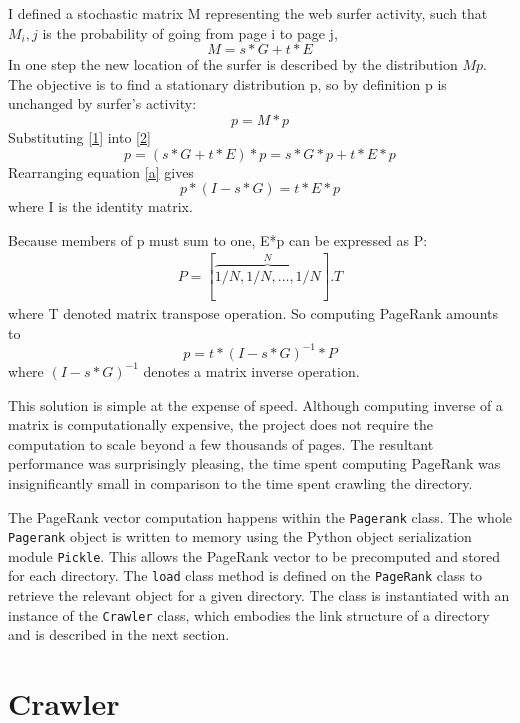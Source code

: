 \documentclass[12pt,notitlepage,twoside]{scrreprt}
\begin{document}
I defined a stochastic matrix M representing the web surfer activity, such
that \(M_i,j\) is the probability of going from page i to page j, 
\begin{equation} \label{1}
  M = s*G +t*E
\end{equation}
In one step the new location of the surfer is described by the distribution \(Mp\).
The objective is to find a stationary distribution p, so by definition p is unchanged by
surfer's activity:
\begin{equation}\label{2}
  p = M*p
\end{equation}
Substituting \ref{1} into \ref{2}
\begin{equation} \label{a}
  p = (s*G+t*E)*p = s*G*p + t*E*p
\end{equation}
Rearranging equation \ref{a} gives
\begin{equation}
  p*(I-s*G) = t*E*p
\end{equation}
where I is the identity matrix.

Because members of p must sum to one, E*p can be expressed as P:
\begin{gather*}
	P = [\overbrace{1/N,1/N,\dots,1/N}^N].T
\end{gather*}
where T denoted matrix transpose operation.
So computing PageRank amounts to
\begin{equation}
p  = t*(I-s*G)^{-1}*P
\end{equation}
where \((I-s*G)^{-1}\) denotes a matrix inverse operation.

This solution is simple at the expense of speed. Although computing inverse of a matrix is
computationally expensive, the project does not require the computation to scale beyond a
few thousands of pages. The resultant performance was surprisingly pleasing, the time
spent computing PageRank was insignificantly small in comparison to the time spent
crawling the directory.

The PageRank vector computation happens within the \texttt{Pagerank} class. The
whole \texttt{Pagerank} object is written to memory using the Python object
serialization module \texttt{Pickle}. This allows the PageRank vector to be precomputed
and stored for each directory. The \texttt{load} class method is defined
on the \texttt{PageRank} class to retrieve the relevant object for a given
directory. The class is instantiated with an instance of the \texttt{Crawler}
class, which embodies the link structure of a directory and is described in the
next section.

\section{Crawler} 
\end{document}
